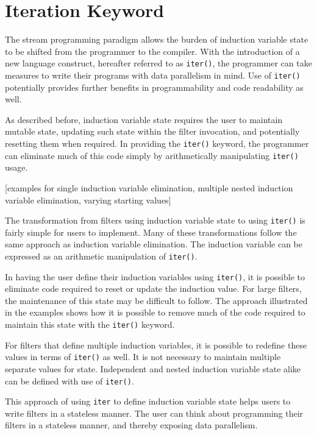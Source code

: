 \section{Iteration Keyword}

The stream programming paradigm allows the burden of induction variable state to be shifted from the programmer to the compiler.  With the introduction of a new language construct, hereafter referred to as {\tt iter()}, the programmer can take measures to write their programs with data parallelism in mind.  Use of {\tt iter()} potentially provides further benefits in programmability and code readability as well.

As described before, induction variable state requires the user to maintain mutable state, updating such state within the filter invocation, and potentially resetting them when required.  In providing the {\tt iter()} keyword, the programmer can eliminate much of this code simply by arithmetically manipulating {\tt iter()} usage.  

[examples for single induction variable elimination, multiple nested induction variable elimination, varying starting values]

The transformation from filters using induction variable state to using {\tt iter()} is fairly simple for users to implement.  Many of these transformations follow the same approach as induction variable elimination.  The induction variable can be expressed as an arithmetic manipulation of {\tt iter()}.

In having the user define their induction variables using {\tt iter()}, it is possible to eliminate code required to reset or update the induction value.  For large filters, the maintenance of this state may be difficult to follow.  The approach illustrated in the examples shows how it is possible to remove much of the code required to maintain this state with the {\tt iter()} keyword.  

For filters that define multiple induction variables, it is possible to redefine these values in terms of {\tt iter()} as well.  It is not necessary to maintain multiple separate values for state.  Independent and nested induction variable state alike can be defined with use of {\tt iter()}.

This approach of using {\tt iter} to define induction variable state helps users to write filters in a stateless manner.  The user can think about programming their filters in a stateless manner, and thereby exposing data parallelism. 



